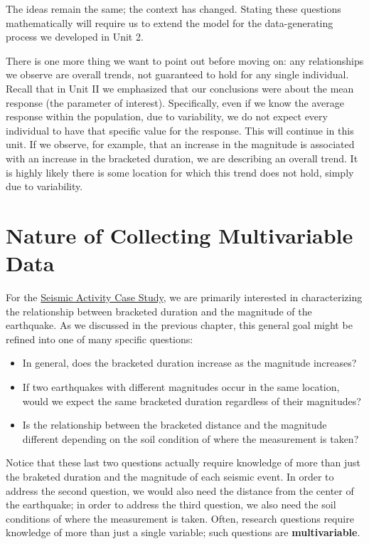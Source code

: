 \documentclass[
]{book}
\providecommand{\tightlist}{%
  \setlength{\itemsep}{0pt}\setlength{\parskip}{0pt}}
\theoremstyle{plain}
\theoremstyle{mydefn}
\theoremstyle{myexmpl}
\theoremstyle{remark}
\begin{document}
The ideas remain the same; the context has changed. Stating these questions mathematically will require us to extend the model for the data-generating process we developed in Unit 2.

There is one more thing we want to point out before moving on: any relationships we observe are overall trends, not guaranteed to hold for any single individual. Recall that in Unit II we emphasized that our conclusions were about the mean response (the parameter of interest). Specifically, even if we know the average response within the population, due to variability, we do not expect every individual to have that specific value for the response. This will continue in this unit. If we observe, for example, that an increase in the magnitude is associated with an increase in the bracketed duration, we are describing an overall trend. It is highly likely there is some location for which this trend does not hold, simply due to variability.

\hypertarget{Regdata}{%
\chapter{Nature of Collecting Multivariable Data}\label{Regdata}}

For the \protect\hyperlink{CaseGreece}{Seismic Activity Case Study}, we are primarily interested in characterizing the relationship between bracketed duration and the magnitude of the earthquake. As we discussed in the previous chapter, this general goal might be refined into one of many specific questions:

\begin{itemize}
\tightlist
\item
  In general, does the bracketed duration increase as the magnitude increases?
\item
  If two earthquakes with different magnitudes occur in the same location, would we expect the same bracketed duration regardless of their magnitudes?
\item
  Is the relationship between the bracketed distance and the magnitude different depending on the soil condition of where the measurement is taken?
\end{itemize}

Notice that these last two questions actually require knowledge of more than just the braketed duration and the magnitude of each seismic event. In order to address the second question, we would also need the distance from the center of the earthquake; in order to address the third question, we also need the soil conditions of where the measurement is taken. Often, research questions require knowledge of more than just a single variable; such questions are \textbf{multivariable}.
\end{document}
